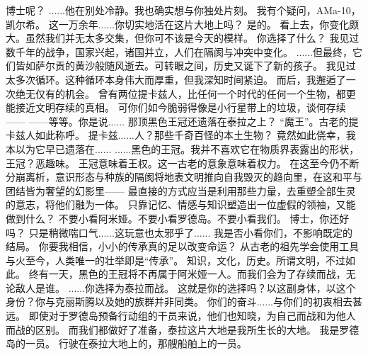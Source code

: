 \documentclass[openany]{book}
\begin{document}
\begin{dialogue}
     博士呢？
     ......他在别处冷静。我也确实想与你独处片刻。
     我有个疑问，AMa-10，凯尔希。
     这一万余年......你切实地活在这片大地上吗？
     是的。
     看上去，你变化颇大。虽然我们并无太多交集，但你可不该是今天的模样。
     你选择了什么？
     我见过数千年的战争，国家兴起，诸国并立，人们在隔阂与冲突中变化。
     ......但最终，它们皆如萨尔贡的黄沙般随风逝去。可转眼之间，历史又诞下了新的孩子。
     我见过太多次循环。这种循环本身伟大而厚重，但我深知时间紧迫。
     而后，我邂逅了一次绝无仅有的机会。
     曾有两位提卡兹人，比任何一个时代的任何一个生物，都更能接近文明存续的真相。
     可你们如今脆弱得像是小行星带上的垃圾，谈何存续——
     ——等等。你是说......
     那顶黑色王冠还遗落在泰拉之上？
     “魔王”。古老的提卡兹人如此称呼。
     提卡兹......人？那些千奇百怪的本土生物？
     竟然如此侥幸，我本以为它早已遗落在......
     ......黑色的王冠。我并不喜欢它在物质界表露出的形状，王冠？恶趣味。
     王冠意味着王权。这一古老的意象意味着权力。
     在这至今仍不断分崩离析，意识形态与种族的隔阂将地表文明推向自我毁灭的趋向里，在这和平与团结皆为奢望的幻影里——
     最直接的方式应当是利用那些力量，去重塑全部生灵的意志，将他们融为一体。
     只靠记忆、情感与知识塑造出一位虚假的领袖，又能做到什么？
     不要小看阿米娅。不要小看罗德岛。不要小看我们。
     博士，你还好吗？
     只是稍微喘口气......这玩意也太邪乎了......
     我是否小看你们，不影响既定的结局。
     你要我相信，小小的传承真的足以改变命运？
     从古老的祖先学会使用工具与火至今，人类唯一的壮举即是“传承”。
     知识，文化，历史。所谓文明，不过如此。
     终有一天，黑色的王冠将不再属于阿米娅一人。而我们会为了存续而战，无论敌人是谁。
     ......你选择为泰拉而战。
     这就是你的选择吗？以这副身体，以这个身份？你与克丽斯腾以及她的族群并非同类。
     你们的奋斗......与你们的初衷相去甚远。
     即使对于罗德岛预备行动组的干员来说，他们也知晓，为自己而战和为他人而战的区别。
     而我们都做好了准备，泰拉这片大地是我所生长的大地。
     我是罗德岛的一员。
     行驶在泰拉大地上的，那艘船舶上的一员。

\end{dialogue}
\end{document}
